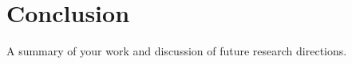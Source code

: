 \chapter{Conclusion}
\label{chap:conclusion}
A summary of your work and discussion of future research directions.
